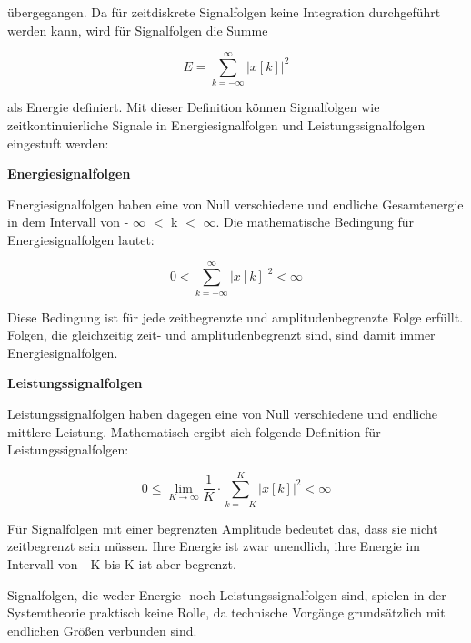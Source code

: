 \noindent \"{u}bergegangen. Da f\"{u}r zeitdiskrete Signalfolgen keine Integration durchgef\"{u}hrt werden kann, wird f\"{u}r Signalfolgen die Summe

\begin{equation}\label{eq:threeeight}
E=\sum _{k=-\infty }^{\infty }\left|x\left[k\right]\right|^{2} 
\end{equation}

\noindent als Energie definiert. Mit dieser Definition k\"{o}nnen Signalfolgen wie zeitkontinuierliche Signale in Energiesignalfolgen und Leistungssignalfolgen eingestuft werden:\bigskip

{\selectfont
\noindent\textbf{Energiesignalfolgen}} \smallskip

\noindent Energiesignalfolgen haben eine von Null verschiedene und endliche Gesamtenergie in dem Intervall von - $\infty$ $\mathrm{<}$ k $\mathrm{<}$ $\infty$. Die mathematische Bedingung f\"{u}r Energiesignalfolgen lautet:

\begin{equation}\label{eq:threenine}
0<\sum _{k=-\infty }^{\infty }\left|x\left[k\right]\right|^{2}  <\infty 
\end{equation}

\noindent Diese Bedingung ist f\"{u}r jede zeitbegrenzte und amplitudenbegrenzte Folge erf\"{u}llt. Folgen, die gleichzeitig zeit- und amplitudenbegrenzt sind, sind damit immer Energiesignalfolgen. \bigskip

{\selectfont
\noindent\textbf{Leistungssignalfolgen}} \smallskip

\noindent Leistungssignalfolgen haben dagegen eine von Null verschiedene und endliche mittlere Leistung. Mathematisch ergibt sich folgende Definition f\"{u}r Leistungssignalfolgen:

\begin{equation}\label{eq:threeten}
0\le {\mathop{\lim }\limits_{K\to \infty }} \frac{1}{K} \cdot \sum _{k=-K}^{K}\left|x\left[k\right]\right|^{2}  <\infty 
\end{equation}

\noindent F\"{u}r Signalfolgen mit einer begrenzten Amplitude bedeutet das, dass sie nicht zeitbegrenzt sein m\"{u}ssen. Ihre Energie ist zwar unendlich, ihre Energie im Intervall von - K bis K ist aber begrenzt. 

\noindent Signalfolgen, die weder Energie- noch Leistungssignalfolgen sind, spielen in der Systemtheorie praktisch keine Rolle, da technische Vorg\"{a}nge grunds\"{a}tzlich mit endlichen Gr\"{o}{\ss}en verbunden sind.

